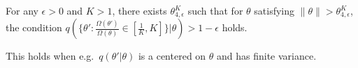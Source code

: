 
\begin{assumption}
For any $\epsilon > 0$ and  $K > 1$, there exists $\theta_{4,\epsilon}^K$ such that 
for $\theta$ satisfying $\| \theta \|  > \theta_{4,\epsilon}^K$, the 
condition
$q(\{\theta':\frac{\Omega(\theta')}{\Omega(\theta)} \in 
  \left[\frac{1}{K}, K\right]\} | \theta) > 1 - \epsilon$ holds.
  \label{asmp:omega}
\end{assumption}
This holds when e.g.\ $q(\theta'|\theta)$ is a centered on $\theta$ and has 
finite variance.




